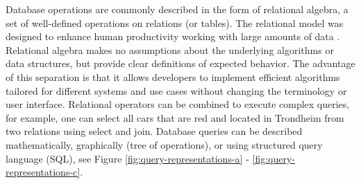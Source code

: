 Database operations are commonly described in the form of relational
algebra, a set of well-defined operations on relations (or tables).
The relational model was designed to enhance human productivity
working with large amounts of data \cite{bratbergsengen}. Relational
algebra makes no assumptions about the underlying algorithms or data
structures, but provide clear definitions of expected behavior.  The
advantage of this separation is that it allows developers to implement
efficient algorithms tailored for different systems and use cases
without changing the terminology or user interface. Relational
operators can be combined to execute complex queries, for example, one
can select all cars that are red and located in Trondheim from two
relations using select and join. Database queries can be described
mathematically, graphically (tree of operations), or using structured
query language (SQL), see Figure \ref{fig:query-representations-a} -
\ref{fig:query-representations-c}.

